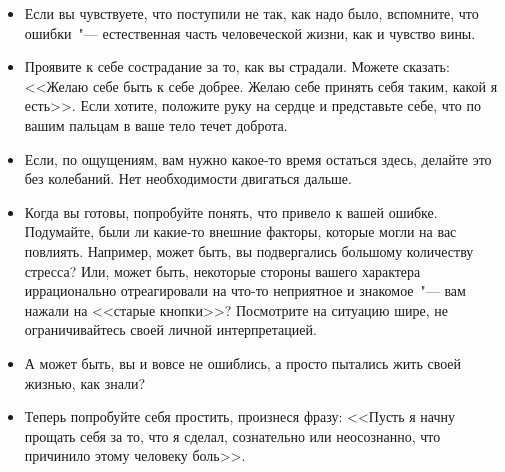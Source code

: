 \vspace{3ex}


\begin{itemize}
	\item Если вы чувствуете, что поступили не так, как надо было, вспомните, что ошибки~"--- естественная часть человеческой жизни, как и чувство вины.

	\item Проявите к себе сострадание за то, как вы страдали. Можете сказать: <<Желаю себе быть к себе добрее. Желаю себе принять себя таким, какой я есть>>. Если хотите, положите руку на сердце и представьте себе, что по вашим пальцам в ваше тело течет доброта. 

	\item Если, по ощущениям, вам нужно какое-то время остаться здесь, делайте это без колебаний. Нет необходимости двигаться дальше.
\end{itemize}

\vspace{3ex}


\begin{itemize}
	\item Когда вы готовы, попробуйте понять, что привело к вашей ошибке. Подумайте, были ли какие-то внешние факторы, которые могли на вас повлиять. Например, может быть, вы подвергались большому количеству стресса? Или, может быть, некоторые стороны вашего характера иррационально отреагировали на что-то неприятное и знакомое~"--- вам нажали на <<старые кнопки>>? Посмотрите на ситуацию шире, не ограничивайтесь своей личной интерпретацией.

	\item А может быть, вы и вовсе не ошиблись, а просто пытались жить своей жизнью, как знали? 
\end{itemize}

\vspace{3ex}


\begin{itemize}
	\item Теперь попробуйте себя простить, произнеся фразу: <<Пусть я начну прощать себя за то, что я сделал, сознательно или неосознанно, что причинило этому человеку боль>>. 
\end{itemize}

\vspace{3ex}


